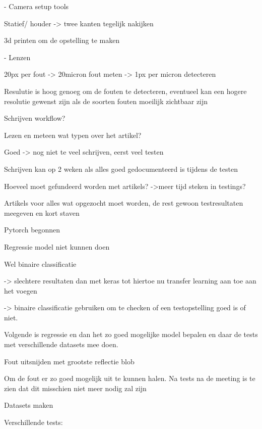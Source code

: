 \documentclass{article}
\begin{document}
-	Camera setup tools

Statief/ houder -\textgreater{} twee kanten tegelijk nakijken

 3d printen om de opstelling te maken 



-	Lenzen

20px per fout -\textgreater{} 20micron fout meten -\textgreater{} 1px per micron detecteren

	Resulutie is hoog genoeg om de fouten te detecteren, eventueel kan een hogere resolutie gewenst zijn als de soorten fouten moeilijk zichtbaar zijn



Schrijven workflow?

	Lezen en meteen wat typen over het artikel?
	
		Goed -\textgreater{} nog niet te veel schrijven, eerst veel testen
		
Schrijven kan op 2 weken als alles goed gedocumenteerd is tijdens de testen

	Hoeveel moet gefundeerd worden met artikels? -\textgreater{}meer tijd steken in testings?
	
	Artikels voor alles wat opgezocht moet worden, de rest gewoon testresultaten meegeven en kort staven

		

Pytorch begonnen

	Regressie model niet kunnen doen
	
	

	Wel binaire classificatie 
	
-\textgreater{} slechtere resultaten dan met keras tot hiertoe nu transfer learning aan toe aan het voegen

-\textgreater{} binaire classificatie gebruiken om te checken of een testopstelling goed is of niet.



Volgende is regressie en dan het zo goed mogelijke model bepalen en daar de tests met verschillende datasets mee doen.



Fout uitsnijden met grootste reflectie blob

Om de fout er zo goed mogelijk uit te kunnen halen. Na tests na de meeting is te zien dat dit misschien niet meer nodig zal zijn





Datasets maken

	Verschillende tests:
	
\end{document}

